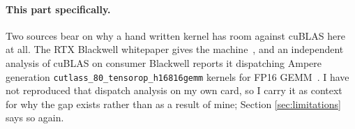 \paragraph{This part specifically.} Two sources bear on why a hand written kernel
has room against cuBLAS here at all. The RTX Blackwell whitepaper gives the
machine~\cite{blackwell}, and an independent analysis of cuBLAS on consumer
Blackwell reports it dispatching Ampere generation
\texttt{cutlass\_80\_tensorop\_h16816gemm} kernels for FP16 GEMM~\cite{cloudrift}.
I have not reproduced that dispatch analysis on my own card, so I carry it as
context for why the gap exists rather than as a result of mine; Section
\ref{sec:limitations} says so again.
